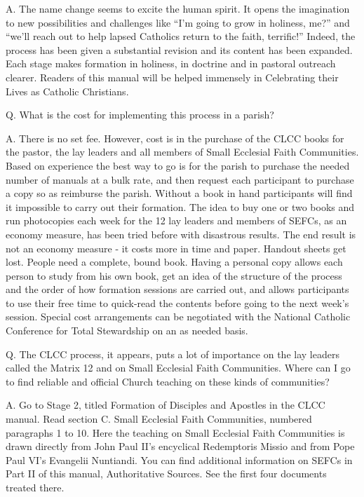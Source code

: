\documentclass[oneside]{book}
\begin{document}
A. The name change seems to excite the human spirit. It opens the imagination to
new possibilities and challenges like ``I'm going to grow in holiness, me?'' and
``we'll reach out to help lapsed Catholics return to the faith, terrific!''
Indeed, the process has been given a substantial revision and its content has
been expanded. Each stage makes formation in holiness, in doctrine and in
pastoral outreach clearer. Readers of this manual will be helped immensely in
Celebrating their Lives as Catholic Christians.

Q. What is the cost for implementing this process in a parish?

A. There is no set fee. However, cost is in the purchase of the CLCC books for
the pastor, the lay leaders and all members of Small Ecclesial Faith
Communities. Based on experience the best way to go is for the parish to
purchase the needed number of manuals at a bulk rate, and then request each
participant to purchase a copy so as reimburse the parish. Without a book in
hand participants will find it impossible to carry out their formation. The idea
to buy one or two books and run photocopies each week for the 12 lay leaders and
members of SEFCs, as an economy measure, has been tried before with disastrous
results. The end result is not an economy measure - it costs more in time and
paper. Handout sheets get lost. People need a complete, bound book.
Having a personal copy allows each person to study from his own book, get an
idea of the structure of the process and the order of how formation sessions are
carried out, and allows participants to use their free time to quick-read the
contents before going to the next week's session.
Special cost arrangements can be negotiated with the National Catholic
Conference for Total Stewardship on an as needed basis.

Q. The CLCC process, it appears, puts a lot of importance on the lay leaders
called the Matrix 12 and on Small Ecclesial Faith Communities. Where can I go to
find reliable and official Church teaching on these kinds of communities?

A. Go to Stage 2, titled Formation of Disciples and Apostles in the CLCC
manual. Read section C. Small Ecclesial Faith Communities, numbered paragraphs 1
to 10. Here the teaching on Small Ecclesial Faith Communities is drawn directly
from John Paul II's encyclical Redemptoris Missio and from Pope Paul VI's
Evangelii Nuntiandi. You can find additional information on SEFCs in Part II of
this manual, Authoritative Sources. See the first four documents treated there.
\end{document}

